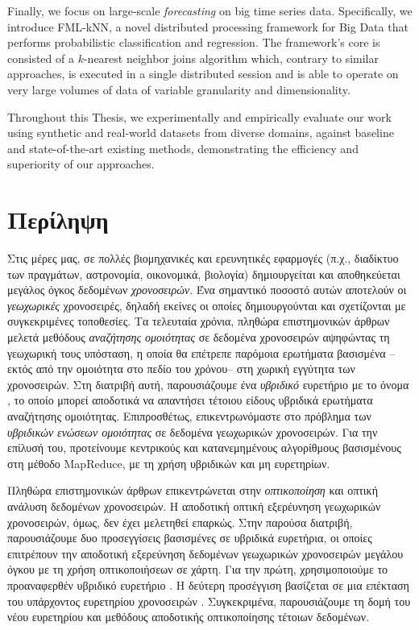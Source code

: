 Finally, we focus on large-scale \textit{forecasting} on big time series data. Specifically, we introduce FML-kNN, a novel distributed processing framework for Big Data that performs probabilistic classification and regression. The framework's core is consisted of a $k$-nearest neighbor joins algorithm which, contrary to similar approaches, is executed in a single distributed session and is able to operate on very large volumes of data of variable granularity and dimensionality.

Throughout this Thesis, we experimentally and empirically evaluate our work using synthetic and real-world datasets from diverse domains, against baseline and state-of-the-art existing methods, demonstrating the efficiency and superiority of our approaches.

\chapter{Περίληψη}


Στις μέρες μας, σε πολλές βιομηχανικές και ερευνητικές εφαρμογές (π.χ., διαδίκτυο των πραγμάτων, αστρονομία, οικονομικά, βιολογία) δημιουργείται και αποθηκεύεται μεγάλος όγκος δεδομένων \textit{χρονοσειρών}. Ένα σημαντικό ποσοστό αυτών αποτελούν οι \textit{γεωχωρικές} χρονοσειρές, δηλαδή εκείνες οι οποίες δημιουργούνται και σχετίζονται με συγκεκριμένες τοποθεσίες. Τα τελευταία χρόνια, πληθώρα επιστημονικών άρθρων μελετά μεθόδους \textit{αναζήτησης ομοιότητας} σε δεδομένα χρονοσειρών αψηφώντας τη γεωχωρική τους υπόσταση, η οποία θα επέτρεπε παρόμοια ερωτήματα βασισμένα --εκτός από την ομοιότητα στο πεδίο του χρόνου-- στη χωρική εγγύτητα των χρονοσειρών. Στη διατριβή αυτή, παρουσιάζουμε ένα \textit{υβριδικό} ευρετήριο με το όνομα \btsr, το οποίο μπορεί αποδοτικά να απαντήσει τέτοιου είδους υβριδικά ερωτήματα αναζήτησης ομοιότητας. Επιπροσθέτως, επικεντρωνόμαστε στο πρόβλημα των \textit{υβριδικών ενώσεων ομοιότητας} σε δεδομένα γεωχωρικών χρονοσειρών. Για την επίλυσή του, προτείνουμε κεντρικούς και κατανεμημένους αλγορίθμους βασισμένους στη μέθοδο MapReduce, με τη χρήση υβριδικών και μη ευρετηρίων.

Πληθώρα επιστημονικών άρθρων επικεντρώνεται στην \textit{οπτικοποίηση} και οπτική ανάλυση δεδομένων χρονοσειρών. Η αποδοτική οπτική εξερέυνηση γεωχωρικών χρονοσειρών, όμως, δεν έχει μελετηθεί επαρκώς. Στην παρούσα διατριβή, παρουσιάζουμε δυο προσεγγίσεις βασισμένες σε υβριδικά ευρετήρια, οι οποίες επιτρέπουν την αποδοτική εξερεύνηση δεδομένων γεωχωρικών χρονοσειρών μεγάλου όγκου με τη χρήση οπτικοποιήσεων σε χάρτη. Για την πρώτη, χρησιμοποιούμε το προαναφερθέν υβριδικό ευρετήριο \btsr. Η δεύτερη προσέγγιση βασίζεται σε μια επέκταση του υπάρχοντος ευρετηρίου χρονοσειρών \isax. Συγκεκριμένα, παρουσιάζουμε τη δομή του νέου ευρετηρίου και μεθόδους αποδοτικής οπτικοποίησης τέτοιων δεδομένων.

